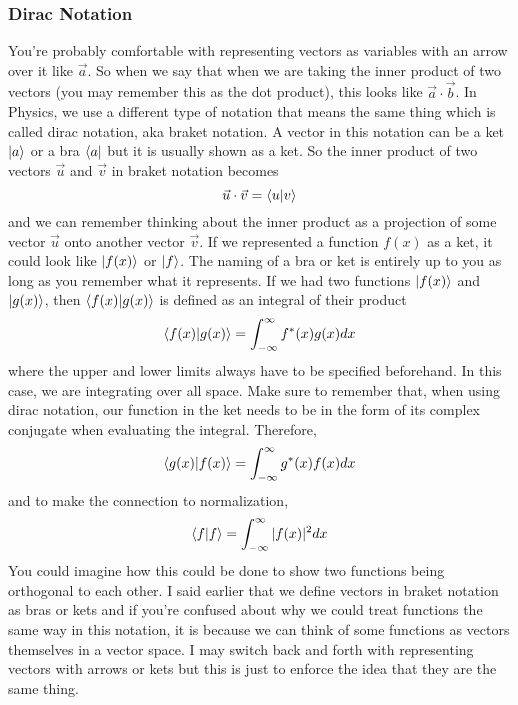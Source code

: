 \documentclass{article}
\newcommand{\be}{\begin{equation}}
\newcommand{\ee}{\end{equation}}
\begin{document}
\subsubsection*{Dirac Notation}
You're probably comfortable with representing vectors as variables with an arrow over it like $\vec{a}$.
So when we say that when we are taking the inner product of two vectors (you may remember this as the dot product), this looks like $\vec{a} \cdot \vec{b}$.
In Physics, we use a different type of notation that means the same thing which is called dirac notation, aka braket notation.
A vector in this notation can be a ket $\ket{a}$ or a bra $\bra{a}$ but it is usually shown as a ket.
So the inner product of two vectors $\vec{u}$ and $\vec{v}$ in braket notation becomes
\be
  \vec{u} \cdot \vec{v} = \braket{u|v}
\ee
and we can remember thinking about the inner product as a projection of some vector $\vec{u}$ onto another vector $\vec{v}$.
If we represented a function $f(x)$ as a ket, it could look like $\ket{f(x)}$ or $\ket{f}$.
The naming of a bra or ket is entirely up to you as long as you remember what it represents.
If we had two functions $\ket{f(x)}$ and $\ket{g(x)}$, then $\braket{f(x)|g(x)}$ is defined as an integral of their product
\be
  \braket{f(x)|g(x)} = \int_{- \infty}^{\infty} f^*(x) g(x) dx
\ee
where the upper and lower limits always have to be specified beforehand.
In this case, we are integrating over all space.
Make sure to remember that, when using dirac notation, our function in the ket needs to be in the form of its complex conjugate when evaluating the integral.
Therefore,
\be
  \braket{g(x)|f(x)} = \int_{- \infty}^{\infty} g^*(x) f(x) dx
\ee
and to make the connection to normalization,
\be
  \braket{f|f} = \int_{- \infty}^{\infty} |f(x)|^2 dx
\ee
You could imagine how this could be done to show two functions being orthogonal to each other.
I said earlier that we define vectors in braket notation as bras or kets and if you're confused about why we could treat functions the same way in this notation, it is because we can think of some functions as vectors themselves in a vector space.
I may switch back and forth with representing vectors with arrows or kets but this is just to enforce the idea that they are the same thing.
\end{document}
